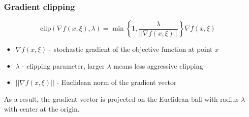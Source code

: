 \begin{frame}
    \frametitle{Gradient clipping}
    $$\text{clip}\left(\nabla f(x, \xi), \lambda \right) = \min \left\{1, \frac{\lambda}{||\nabla f(x, \xi)||} \right\} \nabla f(x, \xi)$$

    \begin{itemize}
        \item $\nabla f(x, \xi)$ - stochastic gradient of the objective function at point $x$
        \item $\lambda$ - clipping parameter, larger $\lambda$ means less aggressive clipping
        \item $||\nabla f(x, \xi)||$ - Euclidean norm of the gradient vector
    \end{itemize}

    As a result, the gradient vector is projected on the Euclidean ball with radius $\lambda$ with center at the origin.
\end{frame}
